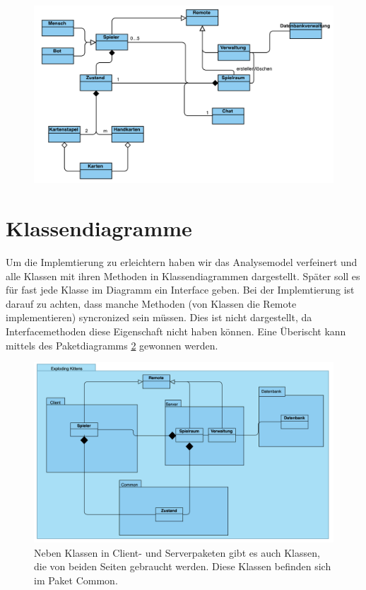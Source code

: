 \documentclass[11pt, a4paper, oneside]{memoir}                                                      %
\begin{document}
        \begin{figure}[h]
			\centering
			\includegraphics[scale=0.4]{../img/Analysemodel.jpg}
			\label{fig:anal}
        \end{figure}

    \clearpage

    \section{Klassendiagramme}
        Um die Implemtierung zu erleichtern haben wir das Analysemodel verfeinert und
        alle Klassen mit ihren Methoden in Klassendiagrammen dargestellt.
        Später soll es für fast jede Klasse im Diagramm ein Interface geben.
        Bei der Implemtierung ist darauf zu achten, dass manche Methoden (von Klassen die Remote implementieren) syncronized sein müssen.
        Dies ist nicht dargestellt, da Interfacemethoden diese Eigenschaft nicht haben können.
        Eine Überischt kann mittels des Paketdiagramms \ref{fig:paket} gewonnen werden.

        \begin{figure}[h]
			\centering
			\includegraphics[scale=0.5]{../img/Klassen_Diagram/Paketdiagramm.png}
			\caption{Neben Klassen in Client- und Serverpaketen gibt es auch Klassen, die von beiden Seiten gebraucht werden. Diese Klassen befinden sich im Paket Common.}
			\label{fig:paket}
        \end{figure}
\end{document}

